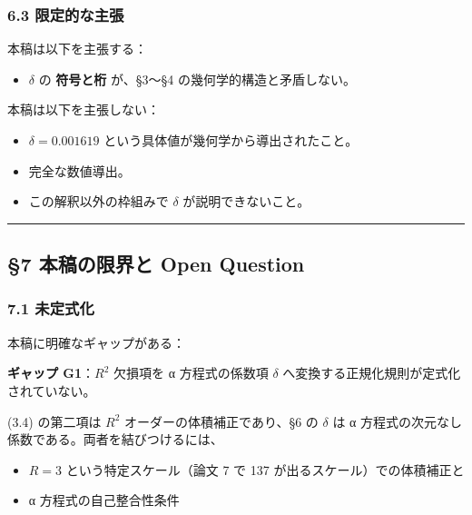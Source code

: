 \documentclass[
]{article}
\providecommand{\tightlist}{%
  \setlength{\itemsep}{0pt}\setlength{\parskip}{0pt}}
\begin{document}
\subsubsection{6.3
限定的な主張}\label{ux9650ux5b9aux7684ux306aux4e3bux5f35}

本稿は以下を主張する：

\begin{itemize}
\tightlist
\item
  \(\delta\) の \textbf{符号と桁} が、§3〜§4
  の幾何学的構造と矛盾しない。
\end{itemize}

本稿は以下を主張しない：

\begin{itemize}
\tightlist
\item
  \(\delta = 0.001619\) という具体値が幾何学から導出されたこと。
\item
  完全な数値導出。
\item
  この解釈以外の枠組みで \(\delta\) が説明できないこと。
\end{itemize}

\begin{center}\rule{0.5\linewidth}{0.5pt}\end{center}

\subsection{§7 本稿の限界と Open
Question}\label{ux672cux7a3fux306eux9650ux754cux3068-open-question}

\subsubsection{7.1 未定式化}\label{ux672aux5b9aux5f0fux5316}

本稿に明確なギャップがある：

\textbf{ギャップ G1}：\(R^2\) 欠損項を α 方程式の係数項 \(\delta\)
へ変換する正規化規則が定式化されていない。

(3.4) の第二項は \(R^2\) オーダーの体積補正であり、§6 の \(\delta\) は α
方程式の次元なし係数である。両者を結びつけるには、

\begin{itemize}
\tightlist
\item
  \(R = 3\) という特定スケール（論文 7 で 137
  が出るスケール）での体積補正と
\item
  α 方程式の自己整合性条件
\end{itemize}
\end{document}
